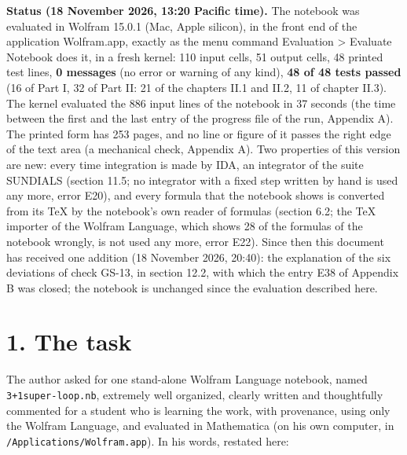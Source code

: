 \documentclass[
  10pt,
]{article}
\begin{document}
\textbf{Status (18 November 2026, 13:20 Pacific time).} The notebook was
evaluated in Wolfram 15.0.1 (Mac, Apple silicon), in the front end of
the application Wolfram.app, exactly as the menu command Evaluation
\textgreater{} Evaluate Notebook does it, in a fresh kernel: 110 input
cells, 51 output cells, 48 printed test lines, \textbf{0 messages} (no
error or warning of any kind), \textbf{48 of 48 tests passed} (16 of
Part I, 32 of Part II: 21 of the chapters II.1 and II.2, 11 of chapter
II.3). The kernel evaluated the 886 input lines of the notebook in 37
seconds (the time between the first and the last entry of the progress
file of the run, Appendix A). The printed form has 253 pages, and no
line or figure of it passes the right edge of the text area (a
mechanical check, Appendix A). Two properties of this version are new:
every time integration is made by IDA, an integrator of the suite
SUNDIALS (section 11.5; no integrator with a fixed step written by hand
is used any more, error E20), and every formula that the notebook shows
is converted from its TeX by the notebook's own reader of formulas
(section 6.2; the TeX importer of the Wolfram Language, which shows 28
of the formulas of the notebook wrongly, is not used any more, error
E22). Since then this document has received one addition (18 November
2026, 20:40): the explanation of the six deviations of check GS-13, in
section 12.2, with which the entry E38 of Appendix B was closed; the
notebook is unchanged since the evaluation described here.

\hypertarget{the-task}{%
\section{1. The task}\label{the-task}}

The author asked for one stand-alone Wolfram Language notebook, named
\texttt{3+1super-loop.nb}, extremely well organized, clearly written and
thoughtfully commented for a student who is learning the work, with
provenance, using only the Wolfram Language, and evaluated in
Mathematica (on his own computer, in
\texttt{/Applications/Wolfram.app}). In his words, restated here:
\end{document}
